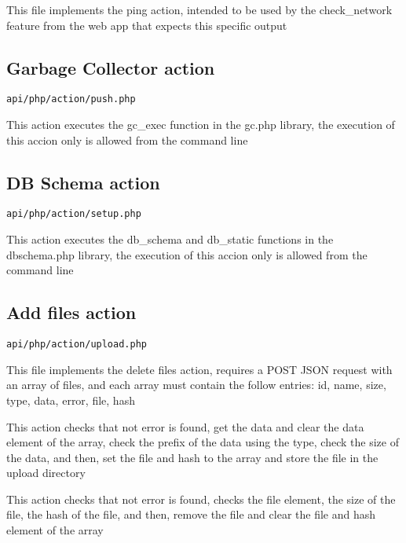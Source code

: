 \documentclass[a4paper]{article}
\begin{document}
This file implements the ping action, intended to be used by the check\_network
feature from the web app that expects this specific output

\hypertarget{toc11}{}
\subsection{Garbage Collector action}

\begin{lstlisting}
api/php/action/push.php
\end{lstlisting}

This action executes the gc\_exec function in the gc.php library, the execution
of this accion only is allowed from the command line

\hypertarget{toc12}{}
\subsection{DB Schema action}

\begin{lstlisting}
api/php/action/setup.php
\end{lstlisting}

This action executes the db\_schema and db\_static functions in the dbschema.php
library, the execution of this accion only is allowed from the command line

\hypertarget{toc13}{}
\subsection{Add files action}

\begin{lstlisting}
api/php/action/upload.php
\end{lstlisting}

This file implements the delete files action, requires a POST JSON request
with an array of files, and each array must contain the follow entries:
id, name, size, type, data, error, file, hash

This action checks that not error is found, get the data and clear the
data element of the array, check the prefix of the data using the type,
check the size of the data, and then, set the file and hash to the
array and store the file in the upload directory

This action checks that not error is found, checks the file element, the
size of the file, the hash of the file, and then, remove the file and
clear the file and hash element of the array
\end{document}
